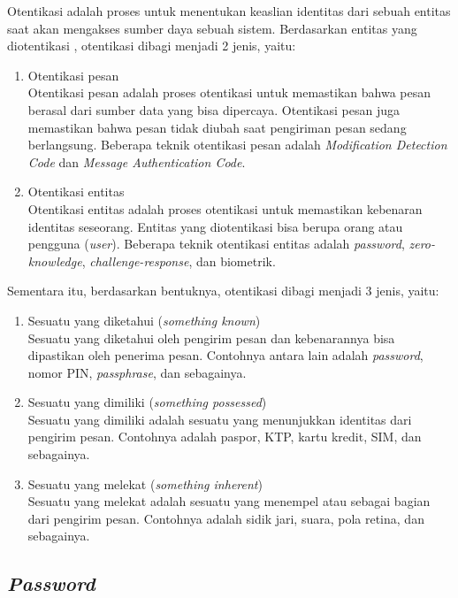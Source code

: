 Otentikasi adalah proses untuk menentukan keaslian identitas dari sebuah entitas saat akan mengakses sumber daya sebuah sistem. Berdasarkan entitas yang diotentikasi \cite{forouzan2007cryptography}, otentikasi dibagi menjadi 2 jenis, yaitu:

\begin{enumerate}
	\item Otentikasi pesan \\
	Otentikasi pesan adalah proses otentikasi untuk memastikan bahwa pesan berasal dari sumber data yang bisa dipercaya. Otentikasi pesan juga memastikan bahwa pesan tidak diubah saat pengiriman pesan sedang berlangsung. Beberapa teknik otentikasi pesan adalah \textit{Modification Detection Code} dan \textit{Message Authentication Code}.
	\item Otentikasi entitas \\
	Otentikasi entitas adalah proses otentikasi untuk memastikan kebenaran identitas seseorang. Entitas yang diotentikasi bisa berupa orang atau pengguna (\textit{user}). Beberapa teknik otentikasi entitas adalah \textit{password}, \textit{zero-knowledge}, \textit{challenge-response}, dan biometrik.
\end{enumerate}

Sementara itu, berdasarkan bentuknya\cite{forouzan2007cryptography}, otentikasi dibagi menjadi 3 jenis, yaitu:
\begin{enumerate}
	\item Sesuatu yang diketahui (\textit{something known}) \\
	Sesuatu yang diketahui oleh pengirim pesan dan kebenarannya bisa dipastikan oleh penerima pesan. Contohnya antara lain adalah \textit{password}, nomor PIN, \textit{passphrase}, dan sebagainya.
	\item Sesuatu yang dimiliki (\textit{something possessed}) \\
	Sesuatu yang dimiliki adalah sesuatu yang menunjukkan identitas dari pengirim pesan. Contohnya adalah paspor, KTP, kartu kredit, SIM, dan sebagainya.
	\item Sesuatu yang melekat (\textit{something inherent}) \\
	Sesuatu yang melekat adalah sesuatu yang menempel atau sebagai bagian dari pengirim pesan. Contohnya adalah sidik jari, suara, pola retina, dan sebagainya.
\end{enumerate}

\subsection{\textit{Password}}


